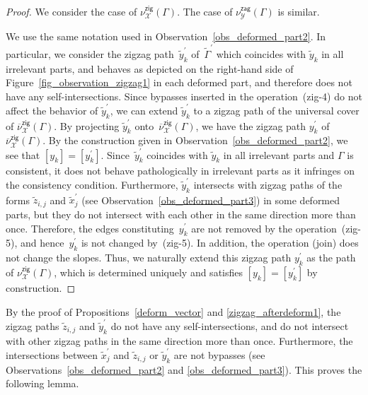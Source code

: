 \documentclass[pdftex]{sigma}%
\numberwithin{equation}{section}
\numberwithin{figure}{section}
\numberwithin{table}{section}
\newcommand{\calX}{\mathcal{X}}
\newcommand{\calY}{\mathcal{Y}}
\newcommand{\zig}{\mathsf{zig}}
\newcommand{\zag}{\mathsf{zag}}
\begin{document}
\begin{proof}We consider the case of $\nu^\zig_\calX(\Gamma)$. The case of $\nu^\zag_\calY(\Gamma)$ is similar.

We use the same notation used in Observation~\ref{obs_deformed_part2}.
In particular, we consider the zigzag path~$\widetilde{y}^\prime_k$ of~$\widetilde{\Gamma}^\prime$ which coincides with $\widetilde{y}_k$ in all irrelevant parts, and behaves as depicted on the right-hand side of Figure~\ref{fig_observation_zigzag1} in each deformed part,
and therefore does not have any self-intersections.
Since bypasses inserted in the operation~(zig-4) do not affect the behavior of $\widetilde{y}^\prime_k$, we can extend $\widetilde{y}^\prime_k$ to a zigzag path of the universal cover of $\overline{\nu}^\zig_\calX(\Gamma)$.
By projecting $\widetilde{y}^\prime_k$ onto~$\overline{\nu}^\zig_\calX(\Gamma)$, we have the zigzag path $y_k^\prime$ of $\overline{\nu}^\zig_\calX(\Gamma)$.
By the construction given in Observation~\ref{obs_deformed_part2}, we see that $[y_k]=[y_k^\prime]$.
Since~$\widetilde{y}^\prime_k$ coincides with $\widetilde{y}_k$ in all irrelevant parts and $\Gamma$ is consistent, it does not behave pathologically in irrelevant parts as it infringes on the consistency condition.
Furthermore, $\widetilde{y}^\prime_k$ intersects with zigzag paths of the forms $\widetilde{z}_{i,j}$ and $\widetilde{x}^\prime_j$ (see Observation~\ref{obs_deformed_part3}) in some deformed parts, but they do not intersect with each other in the same direction more than once.
Therefore, the edges constituting~$y_k^\prime$ are not removed by the operation~(zig-5), and hence~$y_k^\prime$ is not changed by~(zig-5).
In addition, the operation (join) does not change the slopes.
Thus, we naturally extend this zigzag path $y_k^\prime$ as the path of $\nu^\zig_\calX(\Gamma)$, which is determined uniquely and satisfies $[y_k]=[y_k^\prime]$ by construction.
\end{proof}

By the proof of Propositions~\ref{deform_vector} and \ref{zigzag_afterdeform1}, the zigzag paths $\widetilde{z}_{i,j}$
and $\widetilde{y}^\prime_k$ do not have any self-intersections,
and do not intersect with other zigzag paths in the same direction more than once.
Furthermore, the intersections between $\widetilde{x}^\prime_j$ and $\widetilde{z}_{i,j}$ or $\widetilde{y}^\prime_k$ are not bypasses
(see Observations~\ref{obs_deformed_part2} and \ref{obs_deformed_part3}). This proves the following lemma.
\end{document}
